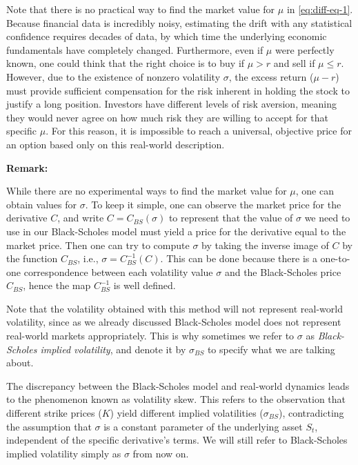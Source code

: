 \documentclass{article}
\newenvironment{importantremark}{%
    \begin{mdframed}[topline=false, bottomline=false, rightline=false, linewidth=2pt, linecolor=gray!50, innerleftmargin=10pt]%
    \textbf{Remark:} %
}{%
    \end{mdframed}%
}
\theoremstyle{definition}
\theoremstyle{remark}
\begin{document}
Note that there is no practical way to find the market value for $\mu$ in \eqref{eq:diff-eq-1}. Because financial data is incredibly noisy, estimating the drift with any statistical confidence requires decades of data, by which time the underlying economic fundamentals have completely changed. Furthermore, even if $\mu$ were perfectly known, one could think that the right choice is to buy if $\mu>r$ and sell if $\mu\leq r$. However, due to the existence of nonzero volatility $\sigma$, the excess return ($\mu - r$) must provide sufficient compensation for the risk inherent in holding the stock to justify a long position. Investors have different levels of risk aversion, meaning they would never agree on how much risk they are willing to accept for that specific $\mu$. For this reason, it is impossible to reach a universal, objective price for an option based only on this real-world description. 
\begin{importantremark}
    While there are no experimental ways to find the market value for $\mu$, one can obtain values for $\sigma$. To keep it simple, one can observe the market price for the derivative $C$, and write $C=C_{BS}(\sigma)$ to represent that the value of $\sigma$ we need to use in our Black-Scholes model must yield a price for the derivative equal to the market price. Then one can try to compute $\sigma$ by taking the inverse image of $C$ by the function $C_{BS}$, i.e., $\sigma=C_{BS}^{-1}(C)$. This can be done because there is a one-to-one correspondence between each volatility value $\sigma$ and the Black-Scholes price $C_{BS}$, hence the map $C_{BS}^{-1}$ is well defined.
    
    Note that the volatility obtained with this method will not represent real-world volatility, since as we already discussed Black-Scholes model does not represent real-world markets appropriately. This is why sometimes we refer to $\sigma$ as \textit{Black-Scholes implied volatility}, and denote it by $\sigma_{BS}$ to specify what we are talking about.
    
    The discrepancy between the Black-Scholes model and real-world dynamics leads to the phenomenon known as volatility skew. This refers to the observation that different strike prices ($K$) yield different implied volatilities ($\sigma_{BS}$), contradicting the assumption that $\sigma$ is a constant parameter of the underlying asset $S_t$, independent of the specific derivative's terms. We will still refer to Black-Scholes implied volatility simply as $\sigma$ from now on.
\end{importantremark}
\end{document}
